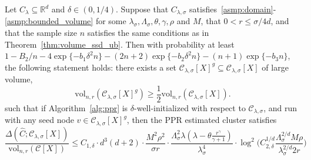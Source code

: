\documentclass[11pt,twoside]{article}
\newcommand{\Reals}{\mathbb{R}}
\newcommand{\1}{\mathbf{1}}
\newcommand{\Rd}{\Reals^d}
\newcommand{\mc}[1]{\mathcal{#1}}
\newcommand{\wh}[1]{\widehat{#1}}
\newcommand{\vol}{\mathrm{vol}}
\begin{document}
\begin{theorem}
	\label{thm:density_cluster_volume_ssd_ub}
	Let $C_{\lambda} \subseteq \Rd$ and $\delta \in (0,1/4)$. Suppose that $C_{\lambda,\sigma}$ satisfies~\ref{asmp:domain}-\ref{asmp:bounded_volume} for some $\lambda_{\sigma}, \Lambda_{\sigma}, \theta, \gamma, \rho$ and $M$, that $0 < r \leq \sigma/4d$, and that the sample size $n$ satisfies the same conditions as in Theorem~\ref{thm:volume_ssd_ub}. Then with probability at least $1 - B_2/n - 4\exp\{-b_1\delta^2n\} - (2n + 2)\exp\{-b_2\delta^2n\} - (n + 1)\exp\{-b_3n\}$, the following statement holds: there exists a set $\mc{C}_{\lambda,\sigma}[X]^g \subseteq \mc{C}_{\lambda,\sigma}[X]$ of large volume, 
$$
\vol_{n,r}(\mc{C}_{\lambda,\sigma}[X]^g) \geq \frac{1}{2} \vol_{n,r}(\mc{C}_{\lambda,\sigma}[X]).
$$ 
such that if Algorithm~\ref{alg:ppr} is $\delta$-well-initialized with respect to $\mc{C}_{\lambda,\sigma}$, and run with any seed node $v \in \mc{C}_{\lambda,\sigma}[X]^g$, then the PPR estimated cluster \smash{$\wh{C}$} satisfies
	\begin{equation}
	\label{eqn:density_cluster_volume_ssd_ub}
	\frac{\Delta(\wh{C};\mc{C}_{\lambda,\sigma}[X])}{\vol_{n,r}(\mc{C}[X])} \leq C_{1,\delta} \cdot d^3(d + 2) \cdot \frac{M^2\rho^2}{\sigma r} \cdot \frac{\Lambda_{\sigma}^2 \lambda (\lambda - \theta \frac{r^{\gamma}}{\gamma + 1})}{\lambda_{\sigma}^4} \cdot \log^2\biggl(C_{2,\delta}^{1/d} \frac{\Lambda_{\sigma}^{2/d} M\rho}{\lambda_{\sigma}^{2/d}2r}\biggr)
	\end{equation}
\end{theorem}
\end{document}
